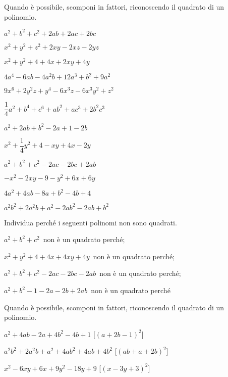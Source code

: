 \begin{esercizio}
\label{ese:16.13}
Quando è possibile, scomponi in fattori, riconoscendo il quadrato di un 
polinomio.
\begin{multicols}{2}
\begin{enumeratea}
 \item $a^{2}+b^{2}+c^{2}+2ab+2ac+2bc$
 \item $x^{2}+y^{2}+z^{2}+2xy-2xz-2yz$
 \item $x^{2}+y^{2}+4+4x+2xy+4y$
 \item $4a^{4}-6{ab}-4a^{2}b+12a^{3}+b^{2}+9a^{2}$
 \item $9x^{6}+2y^{2}z+y^{4}-6x^{3}z-6x^{3}y^{2}+z^{2}$
 \item $\dfrac{1}{4}a^{2}+b^{4}+c^{6}+ab^{2}+{ac}^{3}+2b^{2}c^{3}$
 \item $a^{2}+2ab+b^{2}-2a+1-2b$
 \item $x^{2}+\dfrac{1}{4}y^{2}+4-xy+4x-2y$
 \item $a^{2}+b^{2}+c^{2}-2ac-2bc+2ab$
 \item $-x^{2}-2xy-9-y^{2}+6x+6y$
 \item $4a^{2}+4ab-8a+b^{2}-4b+4$
 \item $a^{2}b^{2}+2a^{2}b+a^{2}-2ab^{2}-2ab+b^{2}$
\end{enumeratea}
\end{multicols}
\end{esercizio}

\begin{esercizio}
Individua perché i seguenti polinomi non sono quadrati.
\label{ese:16.16}
\begin{enumeratea}
 \item $a^{2}+b^{2}+c^{2}$\, non è un quadrato perché\dotfill;
 \item $x^{2}+y^{2}+4+4x+4xy+4y$\, non è un quadrato perché\dotfill;
 \item $a^{2}+b^{2}+c^{2}-2ac-2bc-2ab$\, non è un quadrato perché\dotfill;
 \item $a^{2}+b^{2}-1-2a-2b+2ab$\, non è un quadrato perché\dotfill
\end{enumeratea}
\end{esercizio}

\begin{esercizio}[\Ast]
\label{ese:16.17}
Quando è possibile, scomponi in fattori, riconoscendo il quadrato di un polinomio.
\begin{enumeratea}
 \item $a^{2}+4ab-2a+4b^{2}-4b+1$
  \hfill [$(a+2b-1)^{2}$]
 \item $a^{2}b^{2}+2a^{2}b+a^{2}+4ab^{2}+4ab+4b^{2}$
  \hfill [$(ab+a+2b)^{2}$]
 \item $x^{2}-6xy+6x+9y^{2}-18y+9$
  \hfill [$(x-3y+3)^{2}$]
\end{enumeratea}
\end{esercizio}

